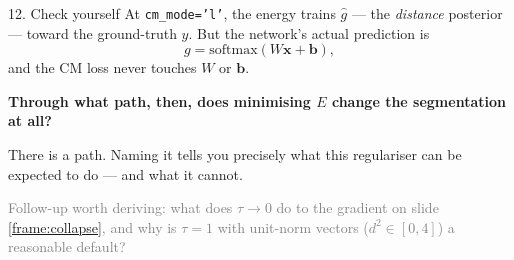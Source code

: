 \documentclass[10pt,aspectratio=169]{beamer}
\newcommand{\xv}{\mathbf{x}}
\begin{document}
\begin{frame}{12. Check yourself}
\small
At \texttt{cm\_mode='l'}, the energy trains $\hat g$ --- the \emph{distance} posterior --- toward the
ground-truth $y$. But the network's actual prediction is
\[
  g = \mathrm{softmax}(W\xv + \mathbf{b}),
\]
and the CM loss never touches $W$ or $\mathbf{b}$.

\vspace{1.2em}
\begin{center}
\textbf{Through what path, then, does minimising $E$ change the segmentation at all?}
\end{center}

\vspace{1.2em}
There is a path. Naming it tells you precisely what this regulariser can be expected to do --- and what it
cannot.

\vspace{1.5em}
\footnotesize
\textcolor{gray}{Follow-up worth deriving: what does $\tau \to 0$ do to the gradient on slide
\ref{frame:collapse}, and why is $\tau = 1$ with unit-norm vectors ($d^2 \in [0,4]$) a reasonable default?}
\end{frame}
\end{document}
